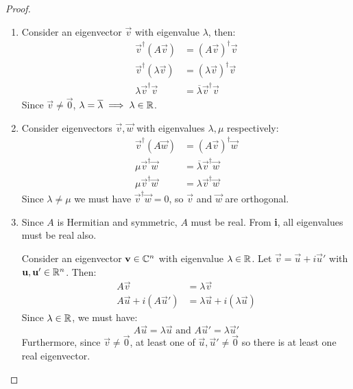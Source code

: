 \documentclass[../main.tex]{subfiles}
\begin{document}
\begin{proof}
  \begin{enumerate}
    \item Consider an eigenvector $\vec{v}$ with eigenvalue $\lambda$, then:
    \begin{align*}
      \vec{v}^{\dag}(A \vec{v}) &= (A \vec{v})^{\dag}\vec{v} \\
      \vec{v}^{\dag}(\lambda \vec{v}) &=(\lambda \vec{v})^{\dag} \vec{v} \\
      \lambda \vec{v}^{\dag}\vec{v} &= \overline{\lambda}\vec{v}^{\dag}\vec{v}
    \end{align*}
    Since $\vec{v} \neq \vec{0}$, $\lambda = \overline{\lambda} \implies \lambda \in \mathbb{R}$.
  \item Consider eigenvectors $\vec{v}, \vec{w}$ with eigenvalues $\lambda, \mu$ respectively:
    \begin{align*}
      \vec{v}^{\dag}(A \vec{w}) &= (A \vec{v})^{\dag} \vec{w} \\
      \mu \vec{v}^{\dag}\vec{w} &= \overline{\lambda} \vec{v}^{\dag} \vec{w} \\
      \mu \vec{v}^{\dag}\vec{w} &= \lambda \vec{v}^{\dag} \vec{w}
    \end{align*}
    Since $\lambda \neq \mu$ we must have $\vec{v}^{\dag}\vec{w} = 0$, so $\vec{v}$ and $\vec{w}$ are orthogonal.
  \item Since $A$ is Hermitian and symmetric, $A$ must be real.
    From \textbf{i}, all eigenvalues must be real also.

    Consider an eigenvector $\mathbf{\bm{v}} \in \mathbb{C}^{n}$ with eigenvalue $\lambda \in \mathbb{R}$.
    Let $\vec{v} = \vec{u} + i \vec{u}'$ with $\mathbf{\bm{u}}, \mathbf{\bm{u}}' \in \mathbb{R}^{n}$.
    Then:
    \begin{align*}
      A \vec{v} &= \lambda \vec{v} \\
      A \vec{u} + i(A \vec{u}') &= \lambda \vec{u} + i(\lambda \vec{u})
    \end{align*}
    Since $\lambda \in \mathbb{R}$, we must have:
    \[
      A \vec{u} = \lambda \vec{u} \text{ and } A \vec{u}' = \lambda \vec{u}'
    \]
    Furthermore, since $\vec{v} \neq \vec{0}$, at least one of $\vec{u}, \vec{u}' \neq \vec{0}$ so there is at least one real eigenvector.
  \end{enumerate}
\end{proof}
\end{document}
